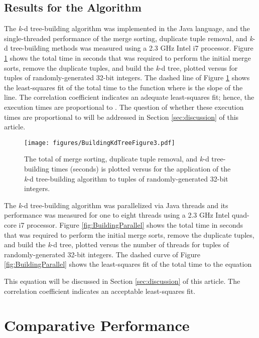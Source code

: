\documentclass{sig-alternate}
\begin{document}
\subsection{Results for the  Algorithm}
\label{sec:knlogn_results}

The  \emph{k}-d tree-building algorithm was implemented in the Java language, and the single-threaded performance of the merge sorting, duplicate tuple removal, and \emph{k}-d tree-building methods was measured using a 2.3 GHz Intel i7 processor.  Figure \ref{fig:BuildingTime} shows the total time in seconds that was required to perform the initial merge sorts, remove the duplicate tuples, and build the \emph{k}-d tree, plotted versus  for   tuples of randomly-generated 32-bit integers. The dashed line of Figure \ref{fig:BuildingTime} shows the least-squares fit of the total time  to the function  where  is the slope of the line.  The correlation coefficient  indicates an adequate least-squares fit; hence, the execution times are proportional to .  The question of whether these execution times are proportional to  will be addressed in Section \ref{sec:discussion} of this article.

\begin{figure}[h]
\centering
\centerline{\texttt{[image: figures/BuildingKdTreeFigure3.pdf]}}
\caption{The total of merge sorting, duplicate tuple removal, and \emph{k}-d tree-building times (seconds) is plotted versus  for the application of the  \emph{k}-d tree-building algorithm to   tuples of randomly-generated 32-bit integers.}
\label{fig:BuildingTime}
\end{figure}

The  \emph{k}-d tree-building algorithm was parallelized via Java threads and its performance was measured for one to eight threads using a 2.3 GHz Intel quad-core i7 processor.  Figure \ref{fig:BuildingParallel} shows the total time in seconds that was required to perform the initial merge sorts, remove the duplicate tuples, and build the \emph{k}-d tree, plotted versus the number of threads  for   tuples of randomly-generated 32-bit integers. The dashed curve of Figure \ref{fig:BuildingParallel} shows the least-squares fit of the total time  to the equation

This equation will be discussed in Section \ref{sec:discussion} of this article.  The correlation coefficient  indicates an acceptable least-squares fit.

\section{Comparative Performance}
\end{document}
